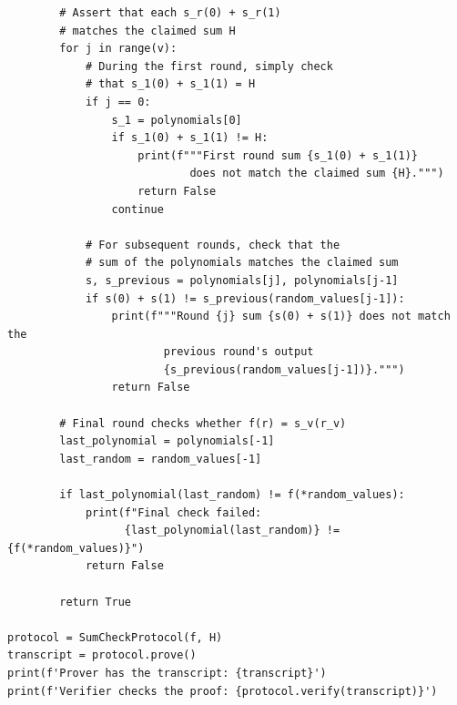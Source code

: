 \documentclass[../../book.tex]{subfiles}
\begin{document}
\begin{verbatim}
        # Assert that each s_r(0) + s_r(1) 
        # matches the claimed sum H
        for j in range(v):
            # During the first round, simply check 
            # that s_1(0) + s_1(1) = H
            if j == 0:
                s_1 = polynomials[0]
                if s_1(0) + s_1(1) != H:
                    print(f"""First round sum {s_1(0) + s_1(1)} 
                            does not match the claimed sum {H}.""")
                    return False
                continue
            
            # For subsequent rounds, check that the 
            # sum of the polynomials matches the claimed sum
            s, s_previous = polynomials[j], polynomials[j-1]
            if s(0) + s(1) != s_previous(random_values[j-1]):
                print(f"""Round {j} sum {s(0) + s(1)} does not match the 
                        previous round's output 
                        {s_previous(random_values[j-1])}.""")
                return False

        # Final round checks whether f(r) = s_v(r_v)
        last_polynomial = polynomials[-1]
        last_random = random_values[-1]

        if last_polynomial(last_random) != f(*random_values):
            print(f"Final check failed: 
                  {last_polynomial(last_random)} != {f(*random_values)}")
            return False
        
        return True

protocol = SumCheckProtocol(f, H)
transcript = protocol.prove()
print(f'Prover has the transcript: {transcript}')
print(f'Verifier checks the proof: {protocol.verify(transcript)}')
\end{verbatim}

\end{document}

